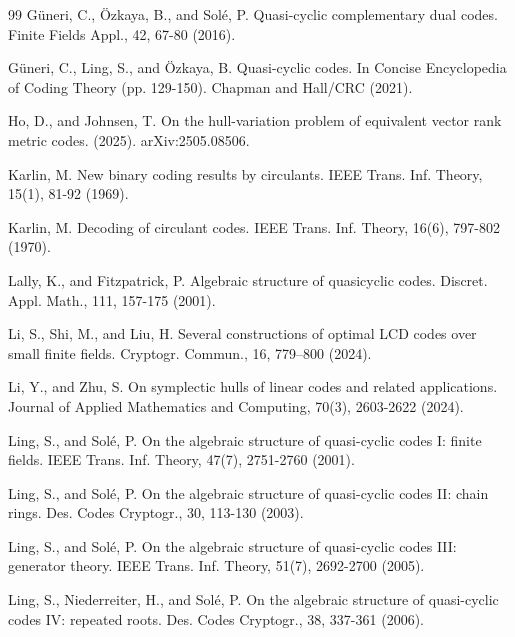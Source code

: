 \documentclass[a4paper,12pt]{article}
\begin{document}
\begin{thebibliography}{99}
G\"uneri, C., \"Ozkaya, B., and Sol\'e, P. Quasi-cyclic complementary dual codes. 
Finite Fields Appl.,  42, 67-80 (2016). 

 G\"uneri, C., Ling, S., and \"Ozkaya, B. Quasi-cyclic codes. In Concise Encyclopedia of Coding Theory (pp. 129-150). Chapman and Hall/CRC (2021). 

 Ho, D., and Johnsen, T.  On the hull-variation problem of equivalent vector rank metric codes. (2025).  arXiv:2505.08506.


 Karlin, M.  New binary coding results by circulants. 
IEEE Trans. Inf. Theory, 15(1), 81-92 (1969).

 Karlin, M. Decoding of circulant codes. 
IEEE Trans. Inf. Theory, 16(6), 797-802  (1970). 


 Lally, K.,  and Fitzpatrick, P.  Algebraic structure of quasicyclic codes. Discret. Appl. Math.,
 111, 157-175 (2001).


 Li, S., Shi, M., and Liu, H. Several constructions of optimal LCD codes over small finite fields. 
Cryptogr. Commun., 16, 779–800 (2024).

 Li, Y., and Zhu, S. On symplectic hulls of linear codes and related applications. Journal of Applied Mathematics and Computing, 70(3), 2603-2622  (2024). 

 Ling, S., and Sol\'e, P. On the algebraic structure of quasi-cyclic codes I: finite fields. 
IEEE Trans. Inf. Theory, 47(7),  2751-2760 (2001). 

 Ling, S., and Sol\'e, P.  On the algebraic structure of quasi-cyclic codes II: chain rings. 
Des. Codes Cryptogr., 30, 113-130 (2003).

 Ling, S., and Sol\'e, P. On the algebraic structure of quasi-cyclic codes III: generator theory.  
IEEE Trans. Inf. Theory, 51(7), 2692-2700 (2005). 

 Ling, S., Niederreiter, H., and Solé, P. On the algebraic structure of quasi-cyclic codes IV: repeated roots. 
Des. Codes Cryptogr., 38, 337-361  (2006).


\end{thebibliography}
\end{document}
